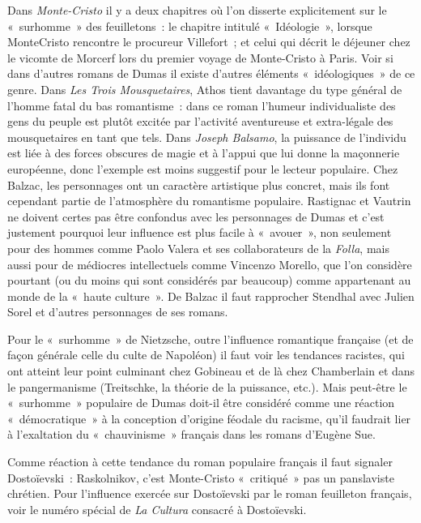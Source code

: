 \documentclass[french,twoside]{book} %
\begin{document}
Dans \emph{Monte-Cristo} il y a deux chapitres où l’on disserte explicitement sur le « surhomme » des feuilletons : le chapitre intitulé « Idéologie », lorsque MonteCristo rencontre le procureur Villefort ; et celui qui décrit le déjeuner chez le vicomte de Morcerf lors du premier voyage de Monte-Cristo à Paris. Voir si dans d’autres romans de Dumas il existe d’autres éléments « idéologiques » de ce genre. Dans \emph{Les Trois Mousquetaires}, Athos tient davantage du type général de l’homme fatal du bas romantisme : dans ce roman l’humeur individualiste des gens du peuple est plutôt excitée par l’activité aventureuse et extra-légale des mousquetaires en tant que tels. Dans \emph{Joseph Balsamo}, la puissance de l’individu est liée à des forces obscures de magie et à l’appui que lui donne la maçonnerie européenne, donc l’exemple est moins suggestif pour le lecteur populaire. Chez Balzac, les personnages ont un caractère artistique plus concret, mais ils font cependant partie de l’atmosphère du romantisme populaire. Rastignac et Vautrin ne doivent certes pas être confondus avec les personnages de Dumas et c’est justement pourquoi leur influence est plus facile à « avouer », non seulement pour des hommes comme Paolo Valera et ses collaborateurs de la \emph{Folla}, mais aussi pour de médiocres intellectuels comme Vincenzo Morello, que l’on considère pourtant (ou du moins qui sont considérés par beaucoup) comme appartenant au monde de la « haute culture ». De Balzac il faut rapprocher Stendhal avec Julien Sorel et d’autres personnages de ses romans.\par
Pour le « surhomme » de Nietzsche, outre l’influence romantique française (et de façon générale celle du culte de Napoléon) il faut voir les tendances racistes, qui ont atteint leur point culminant chez Gobineau et de là chez Chamberlain et dans le pangermanisme (Treitschke, la théorie de la puissance, etc.). Mais peut-être le « surhomme » populaire de Dumas doit-il être considéré comme une réaction « démocratique » à la conception d’origine féodale du racisme, qu’il faudrait lier à l’exaltation du « chauvinisme » français dans les romans d’Eugène Sue.\par
Comme réaction à cette tendance du roman populaire français il faut signaler Dostoïevski : Raskolnikov, c’est Monte-Cristo « critiqué » pas un panslaviste chrétien. Pour l’influence exercée sur Dostoïevski par le roman feuilleton français, voir le numéro spécial de \emph{La Cultura} consacré à Dostoïevski.\par
\end{document}
